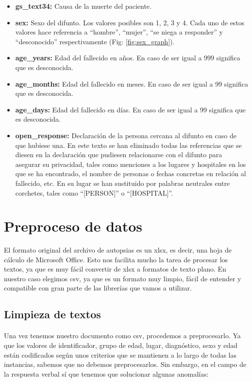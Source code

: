 \documentclass[10pt,a4paper]{article}
\begin{document}
\begin{itemize}
		\item \textbf{gs\_text34:} Causa de la muerte del paciente.
		\item \textbf{sex:} Sexo del difunto. Los valores posibles son 1, 2, 3 y 4. Cada uno de estos valores hace referencia a ``hombre'', ``mujer'', ``se niega a responder'' y ``desconocido'' respectivamente (Fig: \ref{fig:sex_graph}).
		\item \textbf{age\_years:} Edad del fallecido en años. En caso de ser igual a 999 significa que es desconocida.
		\item \textbf{age\_months:} Edad del fallecido en meses. En caso de ser igual a 99 significa que es desconocida.
		\item \textbf{age\_days:} Edad del fallecido en días. En caso de ser igual a 99 significa que es desconocida.
		\item \textbf{open\_response:} Declaración de la persona cercana al difunto en caso de que hubiese una. En este texto se han eliminado todas las referencias que se diesen en la declaración que pudiesen relacionarse con el difunto para asegurar su privacidad, tales como menciones a los lugares y hospitales en los que se ha encontrado, el nombre de personas o fechas concretas en relación al fallecido, etc. En su lugar se han sustituido por palabras neutrales entre corchetes, tales como ``[PERSON]'' o ``[HOSPITAL]''.
	\end{itemize}

\section{Preproceso de datos}
	\paragraph{}
	El formato original del archivo de autopsias es un xlsx, es decir, una hoja de cálculo de Microsoft Office. Esto nos facilita mucho la tarea de procesar los textos, ya que es muy fácil convertir de xlsx a formatos de texto plano. En nuestro caso elegimos csv, ya que es un formato muy limpio, fácil de entender y compatible con gran parte de las librerías que vamos a utilizar.

	\subsection{Limpieza de textos}
	\paragraph{}
	Una vez tenemos nuestro documento como csv, procedemos a preprocesarlo. Ya que los valores de identificador, grupo de edad, lugar, diagnóstico, sexo y edad están codificados según unos criterios que se mantienen a lo largo de todas las instancias, sabemos que no debemos preprocesarlos. Sin embargo, en el campo de la respuesta verbal sí que tenemos que solucionar algunas anomalías:
\end{document}
